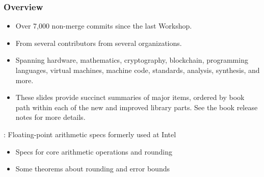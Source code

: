 

\begin{frame}

\frametitle{Overview}

\begin{itemize}
\item Over 7,000 non-merge commits since the last Workshop.
\item From several contributors from several organizations.
\item Spanning hardware, mathematics, cryptography, blockchain,
      programming languages, virtual machines, machine code,
      standards, analysis, synthesis, and more.
\item These slides provide succinct summaries of major items,
      ordered by book path within each of the new and improved library parts.
      See the book release notes for more details.
\end{itemize}

\end{frame}


\begin{frame}

\newlibtitle

:
Floating-point arithmetic specs formerly used at Intel
\begin{itemize}
\item Specs for core arithmetic operations and rounding
\item Some theorems about rounding and error bounds
\end{itemize}

\end{frame}


